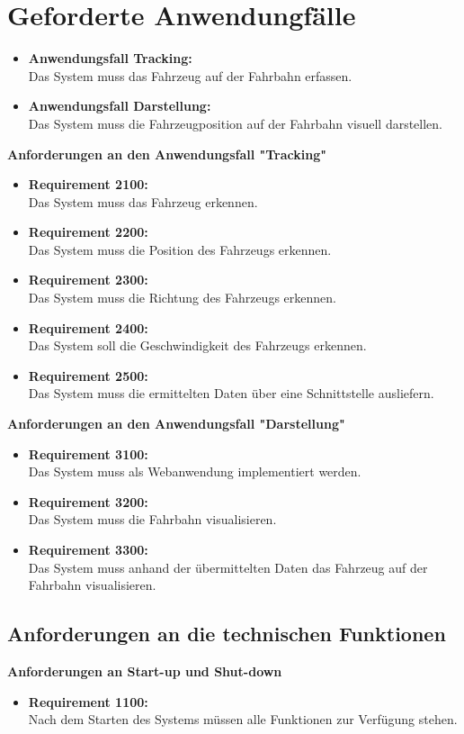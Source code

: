 \section{Geforderte Anwendungf\"alle}

\begin{itemize}
\item \textbf{Anwendungsfall Tracking:}\\
Das System muss das Fahrzeug auf der Fahrbahn erfassen.
\item \textbf{Anwendungsfall Darstellung:}\\
Das System muss die Fahrzeugposition auf der Fahrbahn visuell darstellen.
\end{itemize}

\textbf{Anforderungen an den Anwendungsfall "Tracking"}
\begin{itemize}
\item  \textbf{Requirement 2100:}\\
Das System muss das Fahrzeug erkennen.
\item \textbf{Requirement 2200:}\\
Das System muss die Position des Fahrzeugs erkennen.
\item \textbf{ Requirement 2300:}\\
Das System muss die Richtung des Fahrzeugs erkennen.
\item\textbf{ Requirement 2400:}\\
Das System soll die Geschwindigkeit des Fahrzeugs erkennen.
\item \textbf{Requirement 2500:}\\
Das System muss die ermittelten Daten \"uber eine Schnittstelle ausliefern.
\end{itemize}

\textbf{Anforderungen an den Anwendungsfall "Darstellung"}
\begin{itemize}
\item \textbf{Requirement 3100:}\\
Das System muss als Webanwendung implementiert werden.
\item \textbf{Requirement 3200:}\\
Das System muss die Fahrbahn visualisieren.
\item \textbf{Requirement 3300:}\\
Das System muss anhand der \"ubermittelten Daten das Fahrzeug auf der Fahrbahn visualisieren.
\end{itemize}

\subsection{Anforderungen an die technischen Funktionen}
\textbf{Anforderungen an Start-up und Shut-down}
\begin{itemize}
\item \textbf{Requirement 1100:}\\
Nach dem Starten des Systems m\"ussen alle Funktionen zur Verf\"ugung stehen.
\end{itemize}

